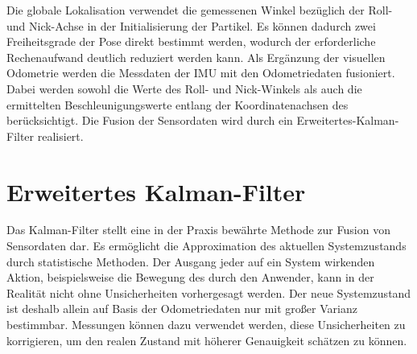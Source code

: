 Die globale Lokalisation verwendet die gemessenen Winkel bezüglich der Roll- und Nick-Achse in der Initialisierung der Partikel. Es können dadurch zwei Freiheitsgrade der Pose direkt bestimmt werden, wodurch der erforderliche Rechenaufwand deutlich reduziert werden kann. Als Ergänzung der visuellen Odometrie werden die Messdaten der IMU mit den Odometriedaten fusioniert. Dabei werden sowohl die Werte des Roll- und Nick-Winkels als auch die ermittelten Beschleunigungswerte entlang der Koordinatenachsen des  berücksichtigt. Die Fusion der Sensordaten wird durch ein Erweitertes-Kalman-Filter realisiert.

\prever{
}
\section{Erweitertes Kalman-Filter}
\label{chap.kalman}
Das Kalman-Filter \cite{Kalman1960} stellt eine in der Praxis bewährte Methode zur Fusion von Sensordaten dar. Es ermöglicht die Approximation des aktuellen Systemzustands durch statistische Methoden. Der Ausgang jeder auf ein System wirkenden Aktion, beispielsweise die Bewegung des  durch den Anwender, kann in der Realität nicht ohne Unsicherheiten vorhergesagt werden. Der neue Systemzustand ist deshalb allein auf Basis der Odometriedaten nur mit großer Varianz bestimmbar. Messungen können dazu verwendet werden, diese Unsicherheiten zu korrigieren, um den realen Zustand mit höherer Genauigkeit schätzen zu können.\\

